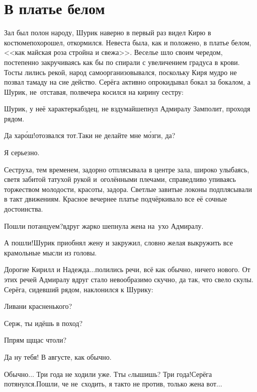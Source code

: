 {
\chapter{В платье белом}
\vepsianrose

\fancyhead[LE]{\fancyplain{}{\bfseries \parttitle}}
\fancyhead[RO]{\fancyplain{}{\bfseries \rightmark}}

Зал был полон народу, Шурик наверно в первый раз видел Кирю в костюме\mdash похорошел, откормился. Невеста была, как и положено, в платье белом, <<как майская роза стройна и свежа>>. Веселье шло своим чередом, постепенно закручиваясь как бы по спирали с увеличением градуса в крови. Тосты лились рекой, народ самоорганизовывался, поскольку Киря мудро не позвал тамаду на сие действо. Серёга активно опрокидывал бокал за бокалом, а Шурик, не~отставая, полвечера косился на кирину сестру:

\diagdash Шурик, у неё характер\mdash кабздец, не вздумай\mdash шепнул Адмиралу Замполит, проходя рядом. 

\diagdash Да хар\'{о}ш!\mdash отозвался тот.\mdash Таки не делайте мне м\'{о}зги, да?

\diagdash Я серьезно.

Сеструха, тем временем, задорно отплясывала в центре зала, широко улыбаясь, светя забитой татухой рукой и~оголёнными плечами, справедливо упиваясь торжеством молодости, красоты, задора. Светлые завитые локоны подплясывали в такт движениям. Красное вечернее платье подчёркивало все её сочные достоинства.

\diagdash Пошли потанцуем?\mdash вдруг жарко шепнула жена на~ухо Адмиралу.

\diagdash А пошли!\mdash Шурик приобнял жену и закружил, словно желая выкружить все крамольные мысли из головы. 

\diagdash Дорогие Кирилл и Надежда$\ldots$\mdash полились речи, всё как обычно, ничего нового. От этих речей Адмиралу вдруг стало невообразимо скучно, да так, что свело скулы. Серёга, сидевший рядом, наклонился к Шурику:

\diagdash Ливани красненького?

\diagdash Серж, ты идёшь в поход? 

\diagdash П\sdash прям щ\sdash щас чтоли?

\diagdash Да ну тебя! В августе, как обычно.

\diagdash Обычно$\ldots$ Три года не ходили уже. Т\sdash ты cлышишь? Три года!\mdash Серёга потянулся.\mdash Пошли, че не~сходить, я так\sdash то не против, только жена вот$\ldots$

}
